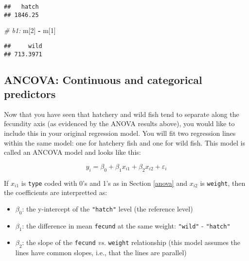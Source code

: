 \documentclass[]{book}
\newenvironment{Shaded}{\begin{snugshade}}{\end{snugshade}}
\newcommand{\KeywordTok}[1]{\textcolor[rgb]{0.13,0.29,0.53}{\textbf{#1}}}
\newcommand{\DataTypeTok}[1]{\textcolor[rgb]{0.13,0.29,0.53}{#1}}
\newcommand{\DecValTok}[1]{\textcolor[rgb]{0.00,0.00,0.81}{#1}}
\newcommand{\StringTok}[1]{\textcolor[rgb]{0.31,0.60,0.02}{#1}}
\newcommand{\CommentTok}[1]{\textcolor[rgb]{0.56,0.35,0.01}{\textit{#1}}}
\newcommand{\OperatorTok}[1]{\textcolor[rgb]{0.81,0.36,0.00}{\textbf{#1}}}
\newcommand{\NormalTok}[1]{#1}
\providecommand{\tightlist}{%
  \setlength{\itemsep}{0pt}\setlength{\parskip}{0pt}}
\theoremstyle{definition}
\theoremstyle{definition}
\theoremstyle{definition}
\theoremstyle{remark}
\begin{document}
\begin{Shaded}
\end{Shaded}

\begin{verbatim}
##   hatch 
## 1846.25
\end{verbatim}

\begin{Shaded}
\begin{Highlighting}[]
\CommentTok{# b1:}
\NormalTok{m[}\DecValTok{2}\NormalTok{] }\OperatorTok{-}\StringTok{ }\NormalTok{m[}\DecValTok{1}\NormalTok{]}
\end{Highlighting}
\end{Shaded}

\begin{verbatim}
##     wild 
## 713.3971
\end{verbatim}

\subsection{ANCOVA: Continuous and categorical
predictors}\label{ancova-continuous-and-categorical-predictors}

Now that you have seen that hatchery and wild fish tend to separate
along the fecundity axis (as evidenced by the ANOVA results above), you
would like to include this in your original regression model. You will
fit two regression lines within the same model: one for hatchery fish
and one for wild fish. This model is called an ANCOVA model and looks
like this:

\begin{equation}
  y_i=\beta_0 + \beta_1 x_{i1} + \beta_2 x_{i2} + \varepsilon_i
\label{eq:ancova}
\end{equation}

If \(x_{i1}\) is \texttt{type} coded with 0's and 1's as in Section
\ref{anova} and \(x_{i2}\) is \texttt{weight}, then the coefficients are
interpretted as:

\begin{itemize}
\tightlist
\item
  \(\beta_0\): the y-intercept of the \texttt{"hatch"} level (the
  reference level)
\item
  \(\beta_1\): the difference in mean \texttt{fecund} at the same
  weight: \texttt{"wild"} - \texttt{"hatch"}
\item
  \(\beta_2\): the slope of the \texttt{fecund} \emph{vs.}
  \texttt{weight} relationship (this model assumes the lines have common
  slopes, i.e., that the lines are parallel)
\end{itemize}
\end{document}
